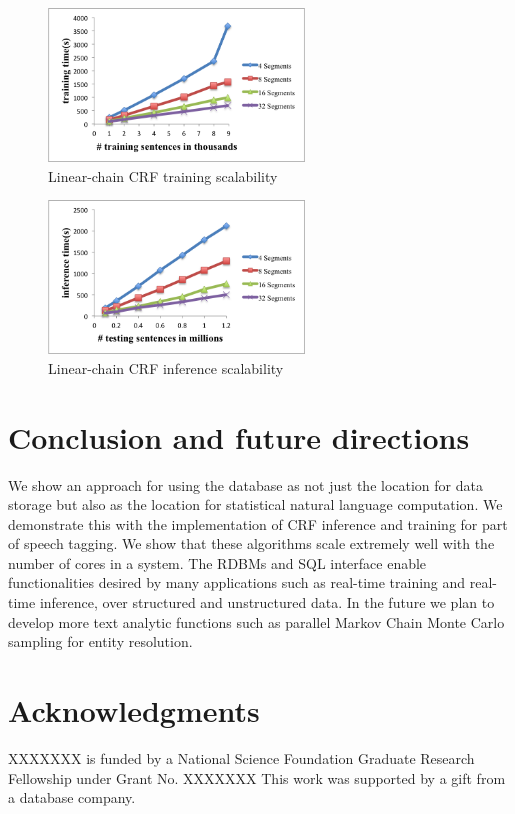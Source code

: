\documentclass[11pt,letterpaper]{article}
\begin{document}
\begin{figure}
\centering
\includegraphics[height=11em]{training}
\caption{Linear-chain CRF training scalability}
\label{fig:crftrain}
\end{figure}

\begin{figure}
\centering
\includegraphics[height=11em]{testing}
\caption{Linear-chain CRF inference scalability}
\label{fig:crftest}
\end{figure}


\section{Conclusion and future directions}
We show an approach for using the database as not just the location for
data storage but also as the location for statistical natural language 
computation.
We demonstrate this with the implementation of CRF inference and training 
for part of speech tagging.
We show that these algorithms scale extremely well with the number of cores
in a system.
The RDBMs and SQL interface enable functionalities desired by many 
applications such as real-time training and real-time inference, over
structured and unstructured data.
In the future we plan to develop more text analytic functions 
such as parallel Markov Chain Monte Carlo sampling 
for entity resolution.




\section*{Acknowledgments}
XXXXXXX is funded by a National
Science Foundation Graduate Research Fellowship under Grant No. XXXXXXX %
This work was supported by a gift from a database company. %


%

\end{document}
